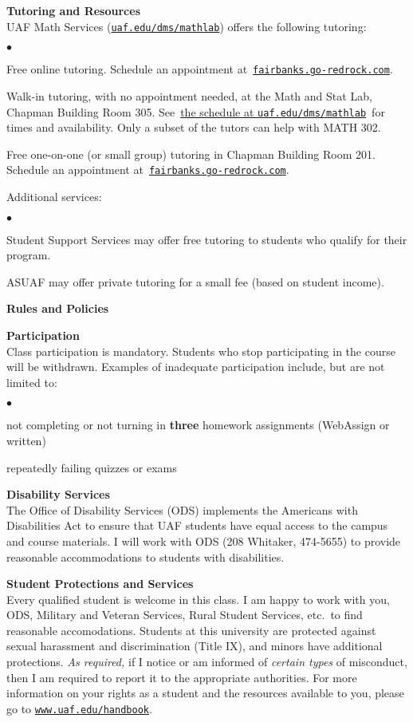 \documentclass[12pt]{article}
\renewcommand{\emph}[1]{\textsf{\textbf{#1}}}
\newcommand{\localhead}[1]{\par\smallskip\textbf{#1}\nobreak\\}%
\def\heading#1{\localhead{\large\emph{#1}}}
\def\subheading#1{\localhead{\emph{#1}}}
\newenvironment{clist}%
{\bgroup\parskip 0pt\begin{list}{$\bullet$}{\partopsep 4pt\topsep 0pt\itemsep -2pt}}%
{\end{list}\egroup}%
\begin{document}
\heading{Tutoring and Resources}
UAF Math Services (\href{http://www.uaf.edu/dms/mathlab/}{\texttt{uaf.edu/dms/mathlab}}) offers the following tutoring:
\begin{clist}
	\item Free online tutoring.  Schedule an appointment at\, \href{https://fairbanks.go-redrock.com/}{\texttt{fairbanks.go-redrock.com}}.
	\item Walk-in tutoring, with no appointment needed, at the Math and Stat Lab, Chapman Building Room 305.  See\, \href{https://uaf.edu/dms/mathlab/math-and-stat-lab-schedul-1/}{the schedule at \texttt{uaf.edu/dms/mathlab}}\, for times and availability.  Only a subset of the tutors can help with MATH 302.
	\item Free one-on-one (or small group) tutoring in Chapman Building Room 201.  Schedule an appointment at\, \href{https://fairbanks.go-redrock.com/}{\texttt{fairbanks.go-redrock.com}}.
\end{clist}

Additional services:
\begin{clist}
	\item Student Support Services may offer free tutoring to students who qualify for their program.
	\item ASUAF may offer private tutoring for a small fee (based on student income).
\end{clist}


\newpage
\strut

\heading{Rules and Policies}
\vskip -20pt
\subheading{Participation}
Class participation is mandatory.  Students who stop participating in the course will be withdrawn.  Examples of inadequate participation include, but are not limited to:

\begin{clist}
\item not completing or not turning in \textbf{three} homework assignments (WebAssign or written)
\item repeatedly failing quizzes or exams
\end{clist}

\subheading{Disability Services}
The Office of Disability Services (ODS) implements the Americans with Disabilities Act to ensure that UAF students have equal access to the campus and course materials.  I will work with ODS (208 Whitaker, 474-5655) to provide reasonable accommodations to students with disabilities.

\subheading{Student Protections and Services}
Every qualified student is welcome in this class.  I am happy to work with you, ODS, Military and Veteran Services, Rural Student Services, etc.~to find reasonable accomodations.  Students at this university are protected against sexual harassment and discrimination (Title IX), and minors have additional protections. \textit{As required,} if I notice or am informed of \textit{certain types} of misconduct, then I am required to report it to the appropriate authorities.  For more information on your rights as a student and the resources available to you, please go to \href{https://www.uaf.edu/handbook/}{\texttt{www.uaf.edu/handbook}}.
\end{document}
